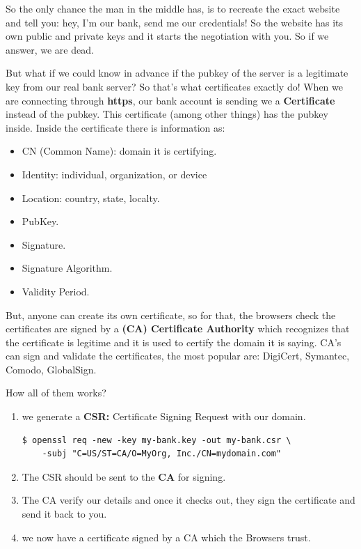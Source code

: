 \documentclass{article}
\newenvironment{codetemplate}[1][]{%
  \mybasecolorbox[#1]
  \itshape
}{%
  \endmybasecolorbox
}
\begin{document}
So the only chance the man in the middle has, is to recreate the exact website and tell you: hey, I'm our bank, send me our credentials! So the website has its own public and private keys and it starts the negotiation with you. So if we answer, we are dead.

But what if we could know in advance if the pubkey of the server is a legitimate key from our real bank server?
So that's what certificates exactly do! When we are connecting through \textbf{https}, our bank account is sending we a \textbf{Certificate} instead of the pubkey.
This certificate (among other things) has the pubkey inside. Inside the certificate there is information as:
\begin{itemize}
    \item CN (Common Name): domain it is certifying.
    \item Identity: individual, organization, or device
    \item Location: country, state, localty.
    \item PubKey.
    \item Signature.
    \item Signature Algorithm.
    \item Validity Period.
\end{itemize}

But, anyone can create its own certificate, so for that, the browsers check the certificates are signed by a \textbf{(CA) Certificate Authority} which recognizes that 
the certificate is legitime and it is used to certify the domain it is saying. CA's can sign and validate the certificates, the most popular are: DigiCert, Symantec, Comodo, GlobalSign.

How all of them works?

\begin{enumerate}
    \item we generate a \textbf{CSR:} Certificate Signing Request with our domain.
\begin{codetemplate}{}
\begin{verbatim}
$ openssl req -new -key my-bank.key -out my-bank.csr \
    -subj "C=US/ST=CA/O=MyOrg, Inc./CN=mydomain.com"
\end{verbatim}
\end{codetemplate}
    \item The CSR should be sent to the \textbf{CA} for signing.
    \item The CA verify our details and once it checks out, they sign the certificate and send it back to you.
    \item we now have a certificate signed by a CA which the Browsers trust.
\end{enumerate}
\end{document}
